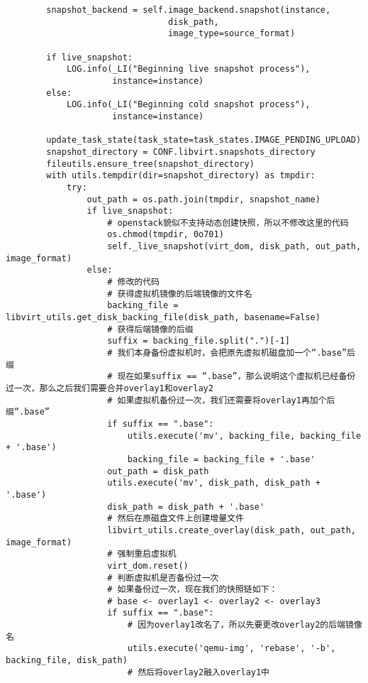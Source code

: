 \documentclass[a4paper,left=1.5cm,right=1.5cm,11pt]{article}
\begin{document}
\begin{lstlisting}
        snapshot_backend = self.image_backend.snapshot(instance,
                                disk_path,
                                image_type=source_format)

        if live_snapshot:
            LOG.info(_LI("Beginning live snapshot process"),
                     instance=instance)
        else:
            LOG.info(_LI("Beginning cold snapshot process"),
                     instance=instance)

        update_task_state(task_state=task_states.IMAGE_PENDING_UPLOAD)
        snapshot_directory = CONF.libvirt.snapshots_directory
        fileutils.ensure_tree(snapshot_directory)
        with utils.tempdir(dir=snapshot_directory) as tmpdir:
            try:
                out_path = os.path.join(tmpdir, snapshot_name)
                if live_snapshot:
                    # openstack貌似不支持动态创建快照，所以不修改这里的代码
                    os.chmod(tmpdir, 0o701)
                    self._live_snapshot(virt_dom, disk_path, out_path, image_format)
                else:
                    # 修改的代码
                    # 获得虚拟机镜像的后端镜像的文件名
                    backing_file = libvirt_utils.get_disk_backing_file(disk_path, basename=False)
                    # 获得后端镜像的后缀
                    suffix = backing_file.split(".")[-1]
                    # 我们本身备份虚拟机时，会把原先虚拟机磁盘加一个“.base”后缀
                    # 现在如果suffix == “.base”，那么说明这个虚拟机已经备份过一次，那么之后我们需要合并overlay1和overlay2
                    # 如果虚拟机备份过一次，我们还需要将overlay1再加个后缀“.base”
                    if suffix == ".base":
                        utils.execute('mv', backing_file, backing_file + '.base')    
                        backing_file = backing_file + '.base'
                    out_path = disk_path
                    utils.execute('mv', disk_path, disk_path + '.base')
                    disk_path = disk_path + '.base'
                    # 然后在原磁盘文件上创建增量文件
                    libvirt_utils.create_overlay(disk_path, out_path, image_format)
                    # 强制重启虚拟机
                    virt_dom.reset()
                    # 判断虚拟机是否备份过一次
                    # 如果备份过一次，现在我们的快照链如下：
                    # base <- overlay1 <- overlay2 <- overlay3
                    if suffix == ".base":
                        # 因为overlay1改名了，所以先要更改overlay2的后端镜像名
                        utils.execute('qemu-img', 'rebase', '-b', backing_file, disk_path)
                        # 然后将overlay2融入overlay1中

\end{lstlisting}
\end{document}
